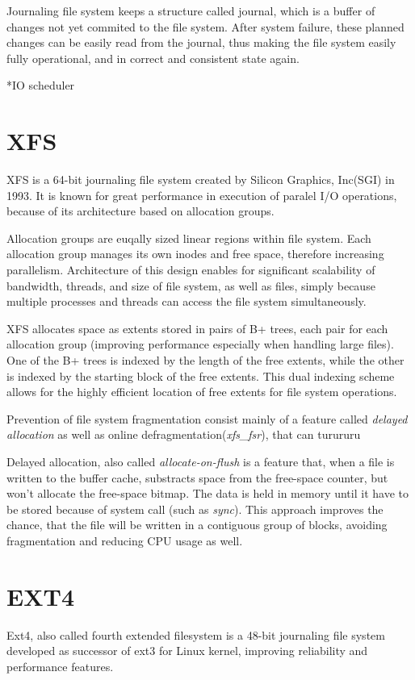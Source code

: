 \documentclass[
  color, %
  table, %
  lof,   %
  lot,   %
]{fithesis3}
\begin{document}
Journaling file system keeps a structure called journal, which is a buffer of changes not yet commited to the file system. After system failure, these planned changes can be easily read from the journal, thus making the file system easily fully operational, and in correct and consistent state again.

*IO scheduler
\section{XFS}
XFS is a 64-bit journaling file system created by Silicon Graphics, Inc(SGI) in 1993. It is known for great performance in execution of paralel I/O operations, because of its architecture based on allocation groups.

Allocation groups are euqally sized linear regions within file system. Each allocation group manages its own inodes and free space, therefore increasing parallelism.
Architecture of this design enables for significant scalability of bandwidth, threads, and size of file system, as well as files, simply because multiple processes and threads can access the file system simultaneously.

XFS allocates space as extents stored in pairs of B+ trees, each pair for each allocation group (improving performance especially when handling large files). One of the B+ trees is indexed by the length of the free extents, while the other is indexed by the starting block of the free extents. This dual indexing scheme allows for the highly efficient location of free extents for file system operations.

Prevention of file system fragmentation consist mainly of a feature called \textit{delayed allocation} as well as online defragmentation(\textit{xfs\_fsr}), that can turururu

Delayed allocation, also called \textit{allocate-on-flush} is a feature that, when a file is written to the buffer cache, substracts space from the free-space counter, but won't allocate the free-space bitmap. The data is held in memory until it have to be stored because of system call (such as \textit{sync}). This approach improves the chance, that the file will be written in a contiguous group of blocks, avoiding fragmentation and reducing CPU usage as well.

\section{EXT4}
Ext4, also called fourth extended filesystem is a 48-bit journaling file system developed as successor of ext3 for Linux kernel, improving reliability and performance features.
\end{document}
